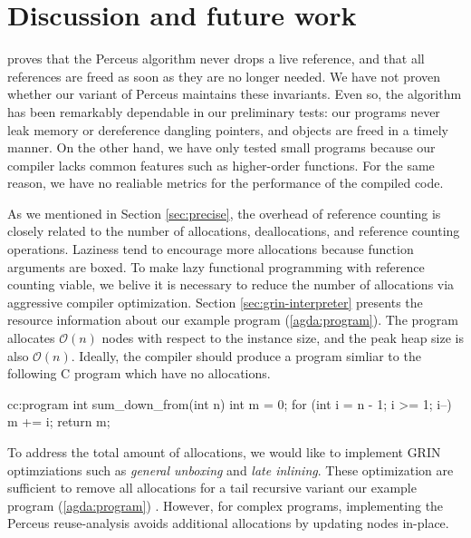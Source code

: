 \documentclass[9pt, twocolumn]{article}
\newcommand{\refp}[1]{(\ref{#1})}
\begin{document}
\section{Discussion and future work}
\label{sec:discussion-and-future-work}
\citet{reinking2021} proves that the Perceus algorithm never drops a live reference, and that all references are freed as soon as they are no longer needed.
We have not proven whether our variant of Perceus maintains these invariants.
Even so, the algorithm has been remarkably dependable in our preliminary tests: our programs never leak memory or dereference dangling pointers, and objects are freed in a timely manner.
On the other hand, we have only tested small programs because our compiler lacks common features such as higher-order functions. 
For the same reason, we have no realiable metrics for the performance of the compiled code.

As we mentioned in Section \ref{sec:precise}, the overhead of reference counting is closely related to the number of allocations, deallocations, and reference counting operations.
Laziness tend to encourage more allocations because function arguments are boxed.
To make lazy functional programming with reference counting viable, we belive it is necessary to reduce the number of allocations via aggressive compiler optimization.
Section \ref{sec:grin-interpreter} presents the resource information about our example program \refp{agda:program}. 
The program allocates $\mathcal{O}(n)$ nodes with respect to the instance size, and the peak heap size is also $\mathcal{O}(n)$.
Ideally, the compiler should produce a program simliar to the following C program which have no allocations.

\begin{typewriter}{c}{c:program}
int sum_down_from(int n){
  int m = 0;
  for (int i = n - 1; i >= 1; i--) 
    m += i;
  return m;
}
\end{typewriter}
To address the total amount of allocations, we would like to implement GRIN optimziations such as \emph{general unboxing} and \emph{late inlining}. 
These optimization are sufficient to remove all allocations for a tail recursive variant our example program \refp{agda:program} \citep{boquist1999}.
However, for complex programs, implementing the Perceus reuse-analysis avoids additional allocations by updating nodes \mbox{in-place}. 
\end{document}
